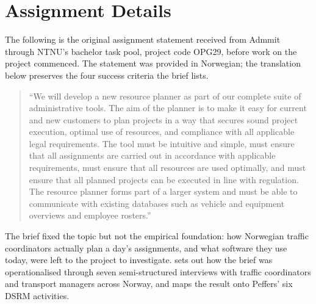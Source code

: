 \chapter*{Assignment Details}

The following is the original assignment statement received from Admmit through NTNU's bachelor task pool, project code OPG29, before work on the project commenced. The statement was provided in Norwegian; the translation below preserves the four success criteria the brief lists.

\begin{quote}
``We will develop a new resource planner as part of our complete suite of administrative tools. The aim of the planner is to make it easy for current and new customers to plan projects in a way that secures sound project execution, optimal use of resources, and compliance with all applicable legal requirements. The tool must be intuitive and simple, must ensure that all assignments are carried out in accordance with applicable requirements, must ensure that all resources are used optimally, and must ensure that all planned projects can be executed in line with regulation. The resource planner forms part of a larger system and must be able to communicate with existing databases such as vehicle and equipment overviews and employee rosters.''
\end{quote}

The brief fixed the topic but not the empirical foundation: how Norwegian traffic coordinators actually plan a day's assignments, and what software they use today, were left to the project to investigate.  sets out how the brief was operationalised through seven semi-structured interviews with traffic coordinators and transport managers across Norway, and  maps the result onto Peffers' six DSRM activities.
